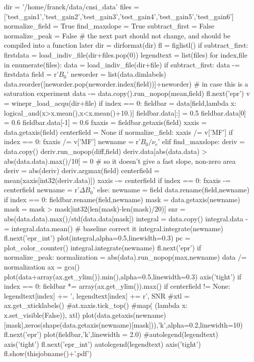 \begin{tiny}
\begin{python}
dir = '/home/franck/data/cnsi_data'
files = ['test_gain1','test_gain2','test_gain3','test_gain4','test_gain5','test_gain6']
normalize_field = True
find_maxslope = True
subtract_first = False
normalize_peak = False
# the next part should not change, and should be compiled into a function later
dir = dirformat(dir)
fl = figlistl()
if subtract_first:
    firstdata = load_indiv_file(dir+files.pop(0))
legendtext = list(files)
for index,file in enumerate(files):
   data = load_indiv_file(dir+file)
   if subtract_first:
       data -= firstdata
   field = r'$B_0$'
   neworder = list(data.dimlabels)
   data.reorder([neworder.pop(neworder.index(field))]+neworder) # in case this is a saturation experiment
   data -= data.copy().run_nopop(mean,field)
   fl.next('epr')
   v = winepr_load_acqu(dir+file)
   if index == 0:
        fieldbar = data[field,lambda x: logical_and(x>x.mean(),x<x.mean()+10.)]
        fieldbar.data[:] = 0.5
        fieldbar.data[0] = 0.6
        fieldbar.data[-1] = 0.6
        fxaxis = fieldbar.getaxis(field)
   xaxis = data.getaxis(field)
   centerfield = None
   if normalize_field:
       xaxis /= v['MF']
       if index == 0:
           fxaxis /= v['MF']
       newname = r'$B_0/\nu_e$'
   elif find_maxslope:
       deriv = data.copy()
       deriv.run_nopop(diff,field)
       deriv.data[abs(data.data) > abs(data.data).max()/10] = 0 # so it doesn't give a fast slope, non-zero area
       deriv = abs(deriv)
       deriv.argmax(field)
       centerfield = mean(xaxis[int32(deriv.data)])
       xaxis -= centerfield
       if index == 0:
           fxaxis -= centerfield
       newname = r'$\Delta B_0$'
   else:
       newname = field
   data.rename(field,newname)
   if index == 0:
       fieldbar.rename(field,newname)
   mask = data.getaxis(newname)
   mask = mask > mask[int32(len(mask)-len(mask)/20)]
   snr = abs(data.data).max()/std(data.data[mask])
   integral = data.copy()
   integral.data -= integral.data.mean() # baseline correct it
   integral.integrate(newname)
   fl.next('epr_int')
   plot(integral,alpha=0.5,linewidth=0.3)
   pc = plot_color_counter()
   integral.integrate(newname)
   fl.next('epr')
   if normalize_peak:
      normalization = abs(data).run_nopop(max,newname)
      data /= normalization
   ax = gca()
   plot(data+array(ax.get_ylim()).min(),alpha=0.5,linewidth=0.3)
   axis('tight')
   if index == 0:
       fieldbar *= array(ax.get_ylim()).max()
   if centerfield != None:
      legendtext[index] += ', %
   legendtext[index] += r', SNR %
#xtl = ax.get_xticklabels()
#at.xaxis.tick_top()
#map( (lambda x: x.set_visible(False)), xtl)
plot(data.getaxis(newname)[mask],zeros(shape(data.getaxis(newname)[mask])),'k',alpha=0.2,linewidth=10)
fl.next('epr')
plot(fieldbar,'k',linewidth = 2.0)
#autolegend(legendtext)
axis('tight')
fl.next('epr_int')
autolegend(legendtext)
axis('tight')
fl.show(thisjobname()+'.pdf')
\end{python}
\end{tiny}




